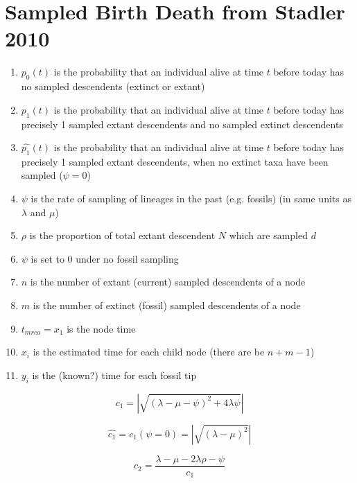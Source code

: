 \documentclass{llncs}
\begin{document}
\section{Sampled Birth Death from Stadler 2010}
 \cite{Stadler2010}

\begin{enumerate}
\item[] $p_0(t)$ is the probability that an individual alive at time $t$ before today has no sampled descendents (extinct or extant)\\
\item[] $p_1(t)$ is the probability that an individual alive at time $t$ before today has precisely 1 sampled extant descendents and no sampled extinct descendents\\
\item[] $\hat{p_1}(t)$ is the probability that an individual alive at time $t$ before today has precisely 1 sampled extant descendents, when no extinct taxa have been sampled ($\psi = 0$)\\
\item[] $\psi$ is the rate of sampling of lineages in the past (e.g. fossils) (in same units as $\lambda$ and $\mu$)\\
\item[] $\rho$ is the proportion of total extant descendent $N$ which are sampled $d$ \\
\item[] $\psi$ is set to 0 under no fossil sampling\\
\item[] $n$ is the number of extant (current) sampled descendents of a node\\
\item[] $m$ is the number of extinct (fossil) sampled descendents of a node\\
\item[] $t_{mrca}=x_1$ is the node time\\
\item[] $x_i$ is the estimated time for each child node (there are be $n+m-1$)\\
\item[] $y_i$ is the (known?) time for each fossil tip\\

\end{enumerate}
$$c_1 = |\sqrt{(\lambda-\mu-\psi)^2 + 4\lambda\psi}|$$

$$\hat{c_1}=c_1(\psi=0) = |\sqrt{(\lambda-\mu)^2}|$$

$$c_2 = \frac{\lambda-\mu-2\lambda\rho-\psi}{c_1}$$
\end{document}
